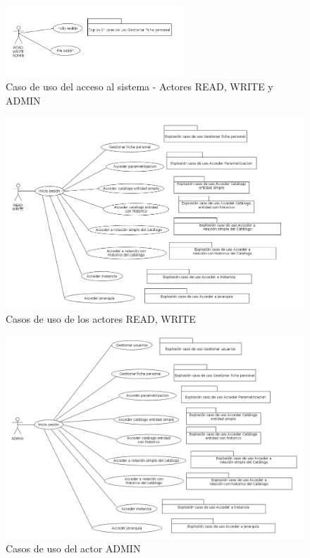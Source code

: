 \begin{figure}[H]
  \centering
  \includegraphics[width=0.6\textwidth]{imaxes/cu_acceso.png}
  \caption{Caso de uso del acceso al sistema - Actores READ, WRITE y ADMIN}
  \label{fig:cu-acceso}
\end{figure}



\begin{figure}[H]
  \centering
  \includegraphics[width=\textwidth]{imaxes/cu-read-write.png}
  \caption{Casos de uso de los actores READ, WRITE}
  \label{fig:cu-read-write}
\end{figure}


\begin{figure}[H]
  \centering
  \includegraphics[width=\textwidth]{imaxes/cu-admin.png}
  \caption{Casos de uso del actor ADMIN}
  \label{fig:cu-admin}
\end{figure}



